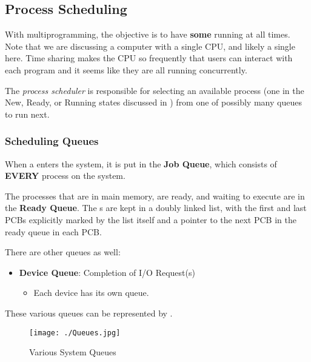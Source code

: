 \subsection{Process Scheduling}\label{subsec:Process_Scheduling}
With multiprogramming, the objective is to have \textbf{some}  running at all times.
Note that we are discussing a computer with a single CPU, and likely a single  here.
Time sharing makes the CPU  so frequently that users can interact with each program and it seems like they are all running concurrently.

\begin{definition}\label{def:Process_Scheduler}
  The \emph{process scheduler} is responsible for selecting an available process (one in the New, Ready, or Running states discussed in ) from one of possibly many queues to run next.
\end{definition}

\subsubsection{Scheduling Queues}\label{subsubsec:Scheduling_Queues}
When a  enters the system, it is put in the \textbf{Job Queue}, which consists of \textbf{EVERY} process on the system.

The processes that are in main memory, are ready, and waiting to execute are in the \textbf{Ready Queue}.
The s are kept in a doubly linked list, with the first and last PCBs explicitly marked by the list itself and a pointer to the next PCB in the ready queue in each PCB.\@

There are other queues as well:
\begin{itemize}[noitemsep]
\item \textbf{Device Queue}: Completion of I/O Request(s)
  \begin{itemize}[noitemsep]
  \item Each device has its own queue.
  \end{itemize}
\end{itemize}

These various queues can be represented by .
\begin{figure}[h!tbp]
  \centering
  \texttt{[image: ./Queues.jpg]}
  \caption{Various System Queues}
  \label{fig:Queues}
\end{figure}

